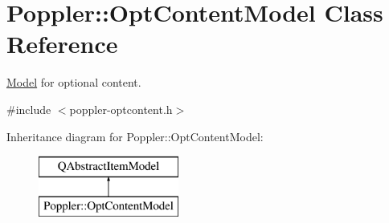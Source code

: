 \hypertarget{class_poppler_1_1_opt_content_model}{}\section{Poppler\+:\+:Opt\+Content\+Model Class Reference}
\label{class_poppler_1_1_opt_content_model}


\hyperlink{class_model}{Model} for optional content.  




{\ttfamily \#include $<$poppler-\/optcontent.\+h$>$}

Inheritance diagram for Poppler\+:\+:Opt\+Content\+Model\+:\begin{figure}[H]
\begin{center}
\leavevmode
\includegraphics[height=2.000000cm]{class_poppler_1_1_opt_content_model}
\end{center}
\end{figure}
